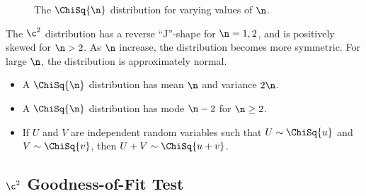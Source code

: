 \begin{figure}[H]
    \centering
    \caption{The $\ChiSq{\n}$ distribution for varying values of $\n$.}
\end{figure}

The $\c^2$ distribution has a reverse ``J''-shape for $\n = 1, 2$, and is positively skewed for $\n > 2$. As $\n$ increase, the distribution becomes more symmetric. For large $\n$, the distribution is approximately normal.

\begin{fact}
    \phantom{.}
    \begin{itemize}
        \item A $\ChiSq{\n}$ distribution has mean $\n$ and variance $2\n$.
        \item A $\ChiSq{\n}$ distribution has mode $\n - 2$ for  $\n \geq 2$.
        \item If $U$ and $V$ are independent random variables such that $U \sim \ChiSq{u}$ and $V \sim \ChiSq{v}$, then $U + V \sim \ChiSq{u + v}$.
    \end{itemize}
\end{fact}

\subsection{\texorpdfstring{$\c^2$}{Chi-Squared} Goodness-of-Fit Test}

